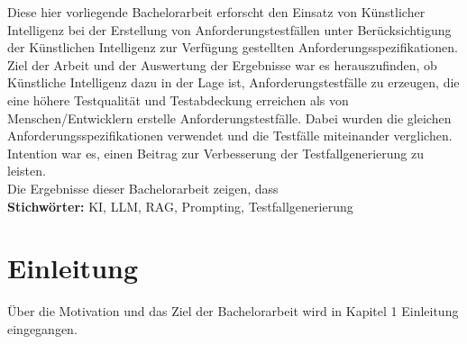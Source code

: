 \documentclass[12pt,toc=bib,toc=listof]{scrreprt}
\begin{document}
\label{sec:zusammenfassung}
Diese hier vorliegende Bachelorarbeit erforscht den Einsatz von Künstlicher Intelligenz bei der Erstellung von Anforderungstestfällen unter Berücksichtigung der Künstlichen Intelligenz zur Verfügung gestellten Anforderungsspezifikationen. Ziel der Arbeit und der Auswertung der Ergebnisse war es herauszufinden, ob Künstliche Intelligenz dazu in der Lage ist, Anforderungstestfälle zu erzeugen, die eine höhere Testqualität und Testabdeckung erreichen als von Menschen/Entwicklern erstelle Anforderungstestfälle. Dabei wurden die gleichen Anforderungsspezifikationen verwendet und die Testfälle miteinander verglichen. Intention war es, einen Beitrag zur Verbesserung der Testfallgenerierung zu leisten.\\
Die Ergebnisse dieser Bachelorarbeit zeigen, dass
\\
\textbf{Stichwörter:} KI, LLM, RAG, Prompting, Testfallgenerierung

\newpage
{}

\chapter{Einleitung} %
\label{sec:einleitung}
Über die Motivation und das Ziel der Bachelorarbeit wird in Kapitel 1 Einleitung eingegangen.
\end{document}
